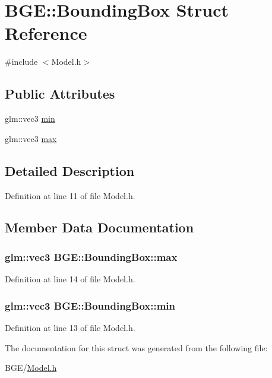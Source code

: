 \hypertarget{struct_b_g_e_1_1_bounding_box}{\section{B\-G\-E\-:\-:Bounding\-Box Struct Reference}
\label{struct_b_g_e_1_1_bounding_box}
}


{\ttfamily \#include $<$Model.\-h$>$}

\subsection*{Public Attributes}
\begin{DoxyCompactItemize}
\item 
glm\-::vec3 \hyperlink{struct_b_g_e_1_1_bounding_box_a68af747f6227933b8dc4a536639af6d5}{min}
\item 
glm\-::vec3 \hyperlink{struct_b_g_e_1_1_bounding_box_a5e1f19b14578fb6ad58d0d4ff4addcca}{max}
\end{DoxyCompactItemize}


\subsection{Detailed Description}


Definition at line 11 of file Model.\-h.



\subsection{Member Data Documentation}
\hypertarget{struct_b_g_e_1_1_bounding_box_a5e1f19b14578fb6ad58d0d4ff4addcca}{
\subsubsection[{max}]{\setlength{\rightskip}{0pt plus 5cm}glm\-::vec3 B\-G\-E\-::\-Bounding\-Box\-::max}}\label{struct_b_g_e_1_1_bounding_box_a5e1f19b14578fb6ad58d0d4ff4addcca}


Definition at line 14 of file Model.\-h.

\hypertarget{struct_b_g_e_1_1_bounding_box_a68af747f6227933b8dc4a536639af6d5}{
\subsubsection[{min}]{\setlength{\rightskip}{0pt plus 5cm}glm\-::vec3 B\-G\-E\-::\-Bounding\-Box\-::min}}\label{struct_b_g_e_1_1_bounding_box_a68af747f6227933b8dc4a536639af6d5}


Definition at line 13 of file Model.\-h.



The documentation for this struct was generated from the following file\-:\begin{DoxyCompactItemize}
\item 
B\-G\-E/\hyperlink{_model_8h}{Model.\-h}\end{DoxyCompactItemize}
